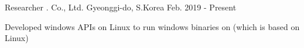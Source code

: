 

\begin{cvskills}

  \cventry
    {Researcher} %
    {\mycompany{}. Co., Ltd.} %
    {Gyeonggi-do, S.Korea} %
    {Feb. 2019 - Present} %
    {
      \begin{cvitems} %
        \item {Developed windows APIs on Linux to run windows binaries on \mycompany{} (which is based on Linux)}
      \end{cvitems}
    }




\end{cvskills}
